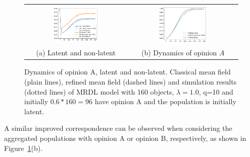 \documentclass{amsart}
\begin{document}
\begin{figure}[ht]
\begin{center}
  \begin{tabular}{cc}
    \includegraphics[width=0.47\textwidth]{MajorityRule_LANA_N160}
    &\includegraphics[width=0.47\textwidth]{MajorityRule_A_N160}\\
    (a) Latent and non-latent & (b) Dynamics of opinion $A$
  \end{tabular}
\end{center}
\caption{\label{fig:mrdl_06_160} Dynamics of opinion A, latent and
  non-latent. Classical mean field (plain lines), refined mean field
  (dashed lines) and simulation results (dotted lines) of MRDL model
  with 160 objects, $\lambda=1.0$, q=10 and initially $0.6*160=96$
  have opinion A and the population is initially latent. }
\end{figure}

A similar improved correspondence can be observed when considering the
aggregated populations with opinion A or opinion B, respectively, as
shown in Figure~\ref{fig:mrdl_06_160}(b).

\end{document}

